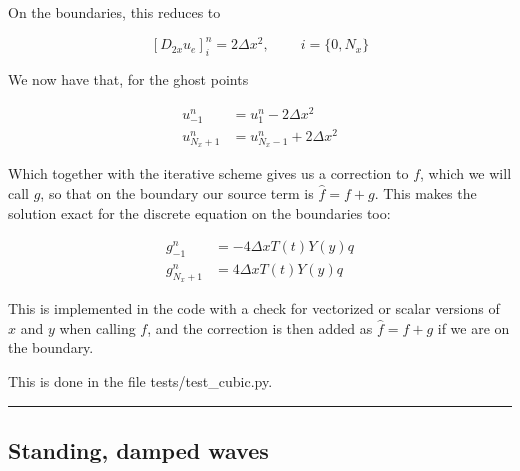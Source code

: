 \documentclass[letterpaper,10pt,english]{/usr/share/sphinx/texinputs/sphinxhowto}
\begin{document}
On the boundaries, this reduces to

\[
\left [ D_{2x} u_e \right ]_{i}^n = 2 \Delta x^2, \qquad \ i = \{0,N_x\}
\]

We now have that, for the ghost points

\begin{align*}
    u_{-1}^n &= u_{1}^n - 2 \Delta x^2 \\
    u_{N_x + 1}^n &= u_{N_x-1}^n + 2 \Delta x^2
\end{align*}

Which together with the iterative scheme gives us a correction to $f$,
which we will call $g$, so that on the boundary our source term is
$\hat f = f + g$. This makes the solution exact for the discrete
equation on the boundaries too:

\begin{align*}
    g_{-1}^n &= - 4 \Delta x T(t) Y(y) q \\
    g_{N_x + 1}^n &= 4 \Delta x T(t) Y(y) q
\end{align*}

This is implemented in the code with a check for vectorized or scalar
versions of $x$ and $y$ when calling $f$, and the correction is then
added as $\hat f = f + g$ if we are on the boundary.

This is done in the file tests/test\_cubic.py.\begin{center}\rule{3in}{0.4pt}\end{center}

\subsection{Standing, damped waves}

\end{document}
